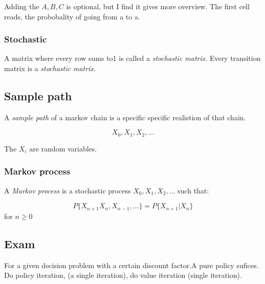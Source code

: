 \documentclass{article}
\begin{document}
Adding the $A,B,C$ is optional, but I find it gives more overview. The first
cell reads, the probobality of going from a to a.

\subsubsection{Stochastic}
A matrix where every row sums to1 is called a \emph{stochastic matrix}. Every
transition matrix is a \emph{stochastic matrix}.

\subsection{Sample path}
A \emph{sample path} of a markov chain is a specific specific realistion of
that chain.

\[ X_0,X_1,X_2,\dots\]

The $X_i$ are random variables.

\subsubsection{Markov process}
A \emph{Markov process} is a stochastic process $X_0, X_1, X_2, \dots$ such 
that:

\[ P\{ X_{n+1} X_n, X_{n-1}, \dots\}=P\{X_{n+1}|X_n\}\]
for $n \ge 0$
\subsection{Exam}
 For a given decision problem with a certain
discount factor.A pure policy sufices.
Do policy iteration, (a single iteration), do value iteration
(single iteration).
\end{document}
